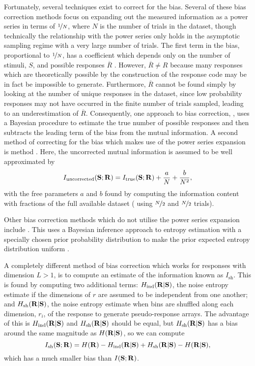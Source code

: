 Fortunately, several techniques exist to correct for the bias.
Several of these bias correction methods focus on expanding out the measured information as a power series \citep{Miller1955,Treves1995} in terms of $\nicefrac{1}{N}$, where $N$ is the number of trials in the dataset, though technically the relationship with the power series only holds in the asymptotic sampling regime with a very large number of trials.
The first term in the bias, proportional to $\nicefrac{1}{N}$, has a coefficient which depends only on the number of stimuli, $S$, and possible responses $\overline{R}$ .
However, $\overline{R} \neq R$ because many responses which are theoretically possible by the construction of the response code may be in fact be impossible to generate.
Furthermore, $\overline{R}$ cannot be found simply by looking at the number of unique responses in the dataset, since low probability responses may not have occurred in the finite number of trials sampled, leading to an underestimation of $\overline{R}$.
Consequently, one approach to bias correction,  \citep{Panzeri1996}, uses a Bayesian procedure to estimate the true number of possible responses and then subtracts the leading term of the bias from the mutual information.
A second method of correcting for the bias which makes use of the power series expansion is  method \citep{Strong1998}.
Here, the uncorrected mutual information is assumed to be well approximated by
$$
I_{\text{uncorrected}}(\mathbf{S};\mathbf{R}) = I_{\text{true}}(\mathbf{S};\mathbf{R}) + \frac{a}{N} + \frac{b}{N^2}
,$$
with the free parameters $a$ and $b$ found by computing the information content with fractions of the full available dataset (\ie{} using $\nicefrac{N}{2}$ and $\nicefrac{N}{2}$ trials).

Other bias correction methods which do not utilise the power series expansion include .
This uses a Bayesian inference approach to entropy estimation with a specially chosen prior probability distribution to make the prior expected entropy distribution uniform \citep{Nemenman2004}.

A completely different method of bias correction which works for responses with dimension $L > 1$, is to compute an estimate of the information known as $I_{\text{sh}}$.
This is found \citep{Montemurro2007} by computing two additional terms: $H_\text{ind}( \mathbf{R} | \mathbf{S} )$, the noise entropy estimate if the dimensions of $r$ are assumed to be independent from one another; and $H_\text{sh}( \mathbf{R} | \mathbf{S} )$, the noise entropy estimate when bins are shuffled along each dimension, $r_i$, of the response to generate pseudo-response arrays.
The advantage of this is $H_\text{ind}( \mathbf{R} | \mathbf{S} )$ and $H_\text{sh}( \mathbf{R} | \mathbf{S} )$ should be equal, but $H_\text{sh}( \mathbf{R} | \mathbf{S} )$ has a bias around the same magnitude as $H( \mathbf{R} | \mathbf{S} )$, so we can compute
$$
I_{\text{sh}}(\mathbf{S};\mathbf{R}) = H( \mathbf{R} ) - H_\text{ind}( \mathbf{R} | \mathbf{S} ) + H_\text{sh}( \mathbf{R} | \mathbf{S} ) - H( \mathbf{R} | \mathbf{S} )
,$$
which has a much smaller bias than $I(\mathbf{S};\mathbf{R})$.

